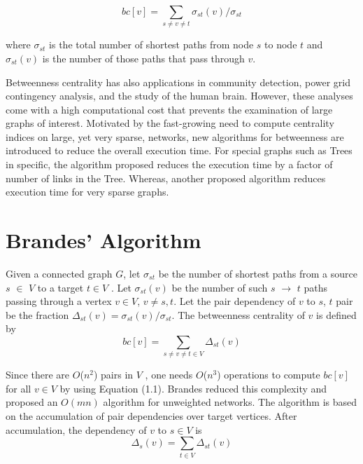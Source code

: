 \documentclass[MTech]{iitmdiss}
\begin{document}
\[bc[v] = \sum_{s\neq v \neq t} \sigma_{st}(v) / \sigma_{st}\]

where $\sigma_{st}$ is the total number of shortest paths from node $s$ to node $t$ and $\sigma_{st}(v)$ is the number of those paths that pass through $v$.

Betweenness centrality has also applications in community detection, power grid contingency analysis, and the study of the human brain. However, these analyses come with a high computational cost that prevents the examination of large graphs of interest. Motivated by the fast-growing need to compute centrality indices on large, yet very sparse, networks, new algorithms for betweenness are introduced to reduce the overall execution time. For special graphs such as Trees in specific, the algorithm proposed reduces the execution time by a factor of number of links in the Tree. Whereas, another proposed algorithm reduces execution time for very sparse graphs. 

\section{Brandes' Algorithm}

Given a connected graph $G$, let  $\sigma_{st}$  be the number of shortest paths from a source $s$ $\in$ $V$ to a target $t \in V$ . Let $\sigma_{st} (v)$ be the number of such $s$ $\rightarrow$ $t$ paths passing through a vertex $v \in V $, $v \neq s, t$. Let the pair dependency of $v$ to $s$, $t$ pair be
the fraction $\Delta_{st}(v) =\sigma_{st}(v) / \sigma_{st}$. The betweenness centrality of $v$ is defined by
\begin{equation} \label{eq1}
bc[v]={\sum_{s \neq v \neq t \in V}}  \Delta_{st}(v)   
\end{equation}

Since there are $O$($n^2$) pairs in $V$ , one needs $O$($n^3$) operations to compute $bc[v]$ for all $v \in V$ by using Equation (1.1). Brandes reduced this complexity and proposed an $O(mn)$ algorithm for unweighted networks. The algorithm is based on the accumulation of pair dependencies over target vertices.
After accumulation, the dependency of $v$ to $s \in V$ is 
\vspace{-0.1em}
\begin{equation} \label{eq2}
\Delta_{s}(v) = {\sum_{t \in V}}\Delta_{st}(v)
\end{equation}
\end{document}
